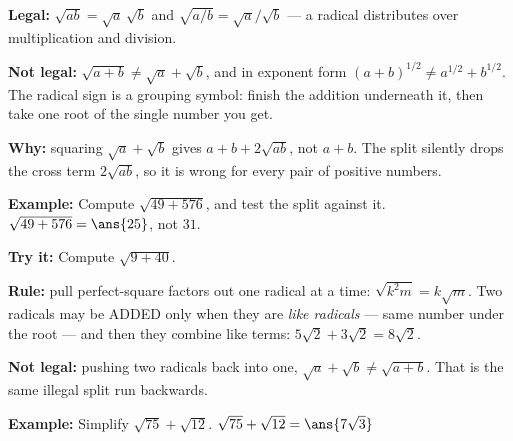 \documentclass[12pt]{article}
\begin{document}


\begin{formulabox}
\textbf{Legal:} $\sqrt{ab}=\sqrt{a}\,\sqrt{b}$ and $\sqrt{a/b}=\sqrt{a}/\sqrt{b}$
--- a radical distributes over multiplication and division.\par
\smallskip
\textbf{Not legal:} $\sqrt{a+b} \ne \sqrt{a}+\sqrt{b}$, and in exponent form
$(a+b)^{1/2} \ne a^{1/2}+b^{1/2}$. The radical sign is a grouping symbol: finish
the addition underneath it, then take one root of the single number you get.\par
\smallskip
\textbf{Why:} squaring $\sqrt{a}+\sqrt{b}$ gives $a+b+2\sqrt{ab}$, not $a+b$.
The split silently drops the cross term $2\sqrt{ab}$, so it is wrong for every
pair of positive numbers.
\end{formulabox}

\begin{examplebox}
\textbf{Example:} \quad Compute $\sqrt{49+576}$, and test the split against it.
$\sqrt{49+576}=\ans{25}$, not $31$.
\end{examplebox}

\begin{tryitbox}
\textbf{Try it:} \quad Compute $\sqrt{9+40}$.\\[2pt]
\end{tryitbox}


\begin{formulabox}
\textbf{Rule:} pull perfect-square factors out one radical at a time:
$\sqrt{k^2 m}=k\sqrt{m}$. Two radicals may be ADDED only when they are
\emph{like radicals} --- same number under the root --- and then they combine
like terms: $5\sqrt{2}+3\sqrt{2}=8\sqrt{2}$.\par
\smallskip
\textbf{Not legal:} pushing two radicals back into one,
$\sqrt{a}+\sqrt{b} \ne \sqrt{a+b}$. That is the same illegal split run
backwards.
\end{formulabox}

\begin{examplebox}
\textbf{Example:} \quad Simplify $\sqrt{75}+\sqrt{12}$.
$\sqrt{75}+\sqrt{12}=\ans{7\sqrt{3}}$
\end{examplebox}
\end{document}
